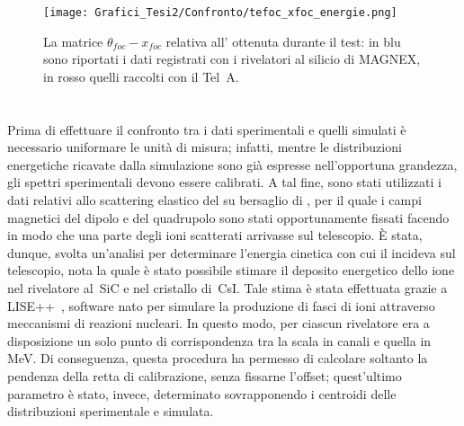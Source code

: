 \begin{figure} [!p]
	\centering
	\texttt{[image: Grafici\_Tesi2/Confronto/tefoc\_xfoc\_energie.png]}
	\caption{La matrice $\theta_{foc} - x_{foc}$ relativa all' ottenuta durante il test: in blu sono riportati i dati registrati con i rivelatori al silicio di MAGNEX, in rosso quelli raccolti con il Tel~A.} \label{fig:tefoc_xfoc}
\end{figure}








\section{}




Prima di effettuare il confronto tra i dati sperimentali e quelli simulati è necessario uniformare le unità di misura; infatti, mentre le distribuzioni energetiche ricavate dalla simulazione sono già espresse nell'opportuna grandezza, gli spettri sperimentali devono essere calibrati.
A tal fine, sono stati utilizzati i dati relativi allo scattering elastico del  su bersaglio di , per il quale i campi magnetici del dipolo e del quadrupolo sono stati opportunamente fissati facendo in modo che una parte degli ioni scatterati arrivasse sul telescopio.
È stata, dunque, svolta un'analisi per determinare l'energia cinetica con cui il  incideva sul telescopio, nota la quale è stato possibile stimare il deposito energetico dello ione nel rivelatore al~SiC e nel cristallo di~CsI.
Tale stima è stata effettuata grazie a LISE++~\cite{tarasov:nimb08}, software nato per simulare la produzione di fasci di ioni attraverso meccanismi di reazioni nucleari.
In questo modo, per ciascun rivelatore era a disposizione un solo punto di corrispondenza tra la scala in canali e quella in MeV.
Di conseguenza, questa procedura ha permesso di calcolare soltanto la pendenza della retta di calibrazione, senza fissarne l'offset; quest'ultimo parametro è stato, invece, determinato sovrapponendo i centroidi delle distribuzioni sperimentale e simulata.


